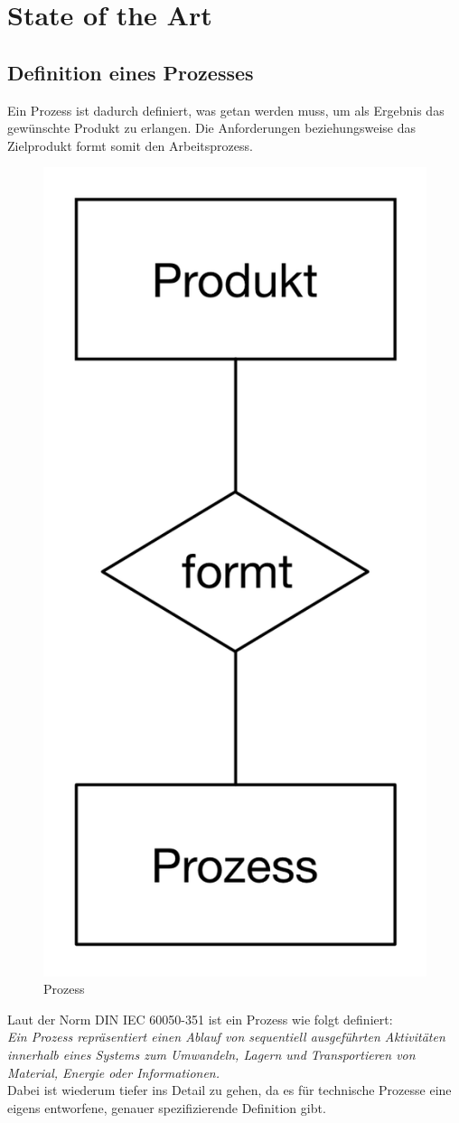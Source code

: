 
\chapter{State of the Art} \label{chapter:stateoftheart}

	
	\section{Definition eines Prozesses}
	Ein Prozess ist dadurch definiert, was getan werden muss, um als Ergebnis das gewünschte Produkt zu erlangen. Die Anforderungen beziehungsweise das Zielprodukt formt somit den Arbeitsprozess.
	
	\begin{figure}[h!]
  		\centering
	\includegraphics[height=0.5\textwidth]{graphics/stateoftheart/Prozess.png}
		\caption{Prozess}
	\end{figure}
	
	Laut der Norm DIN IEC 60050-351 ist ein Prozess wie folgt definiert:\\
		
	\textit{Ein Prozess repräsentiert einen Ablauf von sequentiell ausgeführten Aktivitäten innerhalb eines Systems zum Umwandeln, Lagern und Transportieren von Material, Energie oder Informationen.}\\

	Dabei ist wiederum tiefer ins Detail zu gehen, da es für technische Prozesse eine eigens entworfene, genauer spezifizierende Definition gibt.\\
	
